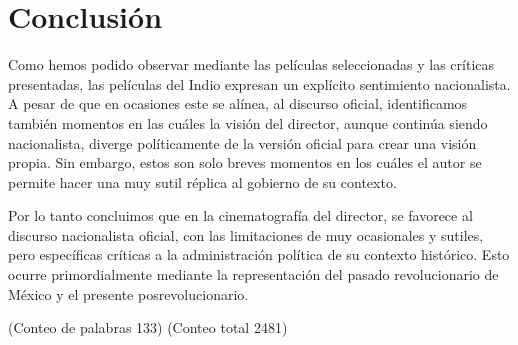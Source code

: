 \section{Conclusión}
Como hemos podido observar mediante las películas seleccionadas y las críticas presentadas, las películas del Indio expresan un explícito sentimiento nacionalista. A pesar de que en ocasiones este se alínea, al discurso oficial, identificamos también momentos en las cuáles la visión del director, aunque continúa siendo nacionalista, diverge políticamente de la versión oficial para crear una visión propia. Sin embargo, estos son solo breves momentos en los cuáles el autor se permite hacer una muy sutil réplica al gobierno de su contexto.

Por lo tanto concluimos que en la cinematografía del director, se favorece al discurso nacionalista oficial, con las limitaciones de  muy ocasionales y sutiles, pero específicas  críticas a la administración política de su contexto histórico. Esto ocurre primordialmente mediante la representación del pasado revolucionario de México y el presente posrevolucionario.

(Conteo de palabras 133)
(Conteo total 2481)
